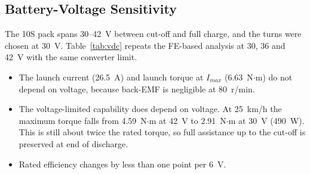 \documentclass[journal]{IEEEtran}
\begin{document}
\subsection{Battery-Voltage Sensitivity}
\label{sec:battery}
The 10S pack spans 30--42~V between cut-off and full charge, and the turns were
chosen at 30~V. Table~\ref{tab:vdc} repeats the FE-based analysis at 30, 36 and
42~V with the same converter limit.
\begin{itemize}
\item The launch current (26.5~A) and launch torque at $I_{max}$ (6.63~N$\cdot$m)
do not depend on voltage, because back-EMF is negligible at 80~r/min.
\item The voltage-limited capability does depend on voltage. At 25~km/h the
maximum torque falls from 4.59~N$\cdot$m at 42~V to 2.91~N$\cdot$m at 30~V
(490~W). This is still about twice the rated torque, so full assistance up to
the cut-off is preserved at end of discharge.
\item Rated efficiency changes by less than one point per 6~V.
\end{itemize}

\begin{table}[!t]
\caption{DC-Link Voltage Sensitivity (FE Characteristic, $I_{max}=29.2$ A)}
\label{tab:vdc}
\centering
\renewcommand{\arraystretch}{1.08}
\setlength{\tabcolsep}{4pt}
\end{table}
\end{document}
